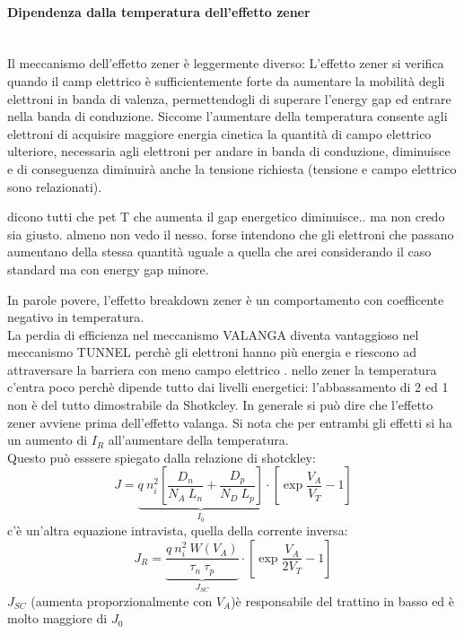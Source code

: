 \paragraph{Dipendenza dalla temperatura dell'effetto zener}\mbox{}\\
Il meccanismo dell'effetto zener è leggermente diverso:
L'effetto zener si verifica quando il camp elettrico è sufficientemente forte da aumentare la mobilità degli elettroni in banda di valenza, permettendogli di superare l'energy gap ed entrare nella banda di conduzione. 
Siccome l'aumentare della temperatura consente agli elettroni di acquisire maggiore energia cinetica la quantità di campo elettrico ulteriore, necessaria agli elettroni per andare in banda di conduzione, diminuisce e di conseguenza diminuirà anche la tensione richiesta (tensione e campo elettrico sono relazionati). 
\begin{ricevimento}
    dicono tutti che pet T che aumenta il gap energetico diminuisce.. ma non credo sia giusto. almeno non vedo il nesso. forse intendono che gli elettroni che passano aumentano della stessa quantità uguale a quella che arei considerando il caso standard ma con energy gap minore.
\end{ricevimento}
In parole povere, l'effetto breakdown zener è un comportamento con coefficente negativo in temperatura.
\\
La perdia di efficienza nel meccanismo VALANGA diventa vantaggioso nel meccanismo TUNNEL perchè gli elettroni hanno più energia e riescono ad attraversare la barriera con meno campo elettrico . nello zener la temperatura c'entra poco perchè dipende tutto dai livelli energetici: l'abbassamento di 2 ed 1 non è del tutto dimostrabile da Shotkcley.
In generale si può dire che l'effetto zener avviene prima dell'effetto valanga. Si nota che per entrambi gli effetti si ha un aumento di $I_R$ all'aumentare della temperatura.\\
Questo può esssere spiegato dalla relazione di shotckley:
\begin{equation}
    J=\underbrace{q\ n_i^2 \left[ \dfrac{D_n}{N_A\ L_n} + \dfrac{D_p}{N_D\ L_p}\right]}_{I_0} \cdot \left[\exp{\dfrac{V_A}{V_T}-1}\right]
\end{equation}
c'è un'altra equazione intravista, quella della corrente inversa:
\begin{equation}
    J_R= \underbrace{\dfrac{q\ n_i^2\ W(V_A)}{\tau_n\ \tau_p}}_{J_{SC}} \cdot \left[\exp{\dfrac{V_A}{2V_T}-1}\right]
\end{equation}
$J_{SC}$ (aumenta proporzionalmente con $V_A$)è responsabile del trattino in basso ed è molto maggiore di $J_0$
